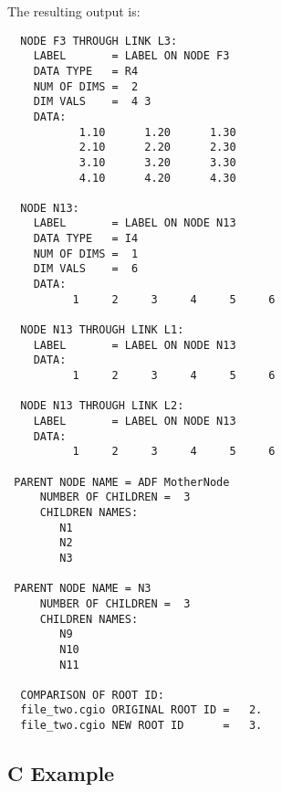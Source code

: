\noindent
The resulting output is:

\begin{verbatim}
  NODE F3 THROUGH LINK L3:
    LABEL       = LABEL ON NODE F3
    DATA TYPE   = R4
    NUM OF DIMS =  2
    DIM VALS    =  4 3
    DATA:
           1.10      1.20      1.30
           2.10      2.20      2.30
           3.10      3.20      3.30
           4.10      4.20      4.30

  NODE N13:
    LABEL       = LABEL ON NODE N13
    DATA TYPE   = I4
    NUM OF DIMS =  1
    DIM VALS    =  6
    DATA:
          1     2     3     4     5     6

  NODE N13 THROUGH LINK L1:
    LABEL       = LABEL ON NODE N13
    DATA:
          1     2     3     4     5     6

  NODE N13 THROUGH LINK L2:
    LABEL       = LABEL ON NODE N13
    DATA:
          1     2     3     4     5     6

 PARENT NODE NAME = ADF MotherNode
     NUMBER OF CHILDREN =  3
     CHILDREN NAMES:
        N1
        N2
        N3

 PARENT NODE NAME = N3
     NUMBER OF CHILDREN =  3
     CHILDREN NAMES:
        N9
        N10
        N11

  COMPARISON OF ROOT ID:
  file_two.cgio ORIGINAL ROOT ID =   2.
  file_two.cgio NEW ROOT ID      =   3.
\end{verbatim}

\subsection{C Example} \label{s:C}

